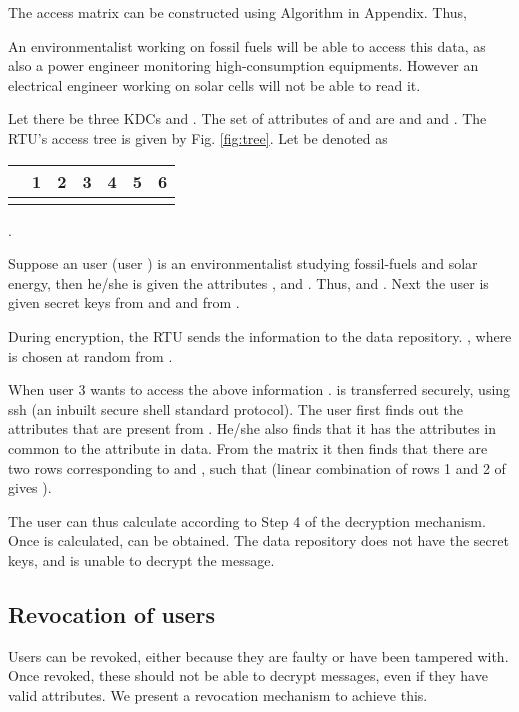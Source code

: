 \documentclass[conference]{IEEEtran}[10pt]
\begin{document}
The access matrix   can be constructed using Algorithm in Appendix.  
Thus, 
\begin{center}

\end{center}
An environmentalist working on fossil fuels will be able to access this data, as also a power engineer monitoring high-consumption equipments. 
However an electrical engineer working on solar cells will not be able to read it. 


Let there be three KDCs  and . 
The set of attributes of  and  are
 and
 and 
.
The RTU's access tree is given by  Fig. \ref{fig:tree}. 
Let  be denoted as
\begin{center}
\begin{tabular}{c|c|c|c|c|c|c}
 & 1 &2 &3 &4 &5 &6\\
\hline
 &  &  &  &  &  &
\end{tabular} .
\end{center}

Suppose an user (user ) is an environmentalist studying fossil-fuels and solar energy, then 
he/she  is given the attributes ,  and . 
Thus,  and 
. 
Next the user is given secret keys  from  and  and  from . 


During encryption, the RTU sends the information   to the
data repository.  
, where  is chosen at random from . 

When user 3 wants to access the above information .  is transferred securely, using ssh (an inbuilt secure shell standard protocol). 
The user first finds out the attributes that are present from . 
He/she also finds that it has the attributes  in common to the attribute in data. 
From the matrix  it then finds that there are two rows corresponding to  and , such that
 (linear combination of rows 1 and 2 of  gives ). 

The user can thus calculate  according to Step 4 of the decryption mechanism. 
Once  is calculated,  can be obtained. 
The data repository does not have the secret keys, and is unable to decrypt the message. 


\subsection{Revocation of users}
\label{subsec:revoke}
Users can be revoked, either because they are faulty or have been tampered with. 
Once revoked, these should not be able to decrypt messages, even if they have valid attributes. 
We present a revocation mechanism to achieve this. 
\end{document}
